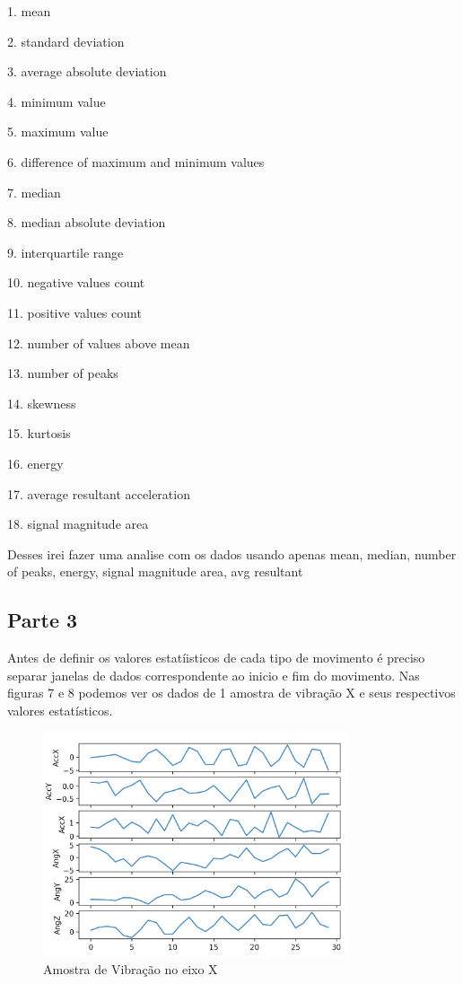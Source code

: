 1. mean

2. standard deviation

3. average absolute deviation

4. minimum value

5. maximum value

6. difference of maximum and minimum values

7. median

8. median absolute deviation

9. interquartile range

10. negative values count

11. positive values count

12. number of values above mean

13. number of peaks

14. skewness

15. kurtosis

16. energy

17. average resultant acceleration

18. signal magnitude area


Desses irei fazer uma analise com os dados usando apenas mean, median, number of peaks, energy, signal magnitude area, avg resultant


\subsection*{Parte 3}


Antes de definir os valores estatíisticos de cada tipo de movimento é preciso separar janelas de dados correspondente ao inicio e fim do movimento.
Nas figuras 7 e 8 podemos ver os dados de 1 amostra de vibração X e seus respectivos valores estatísticos.


\begin{figure}[H]
    \center
    \includegraphics[width=9cm]{images/VibracaoX_1_raw.png}
    \caption{Amostra de Vibração no eixo X}
\end{figure}

